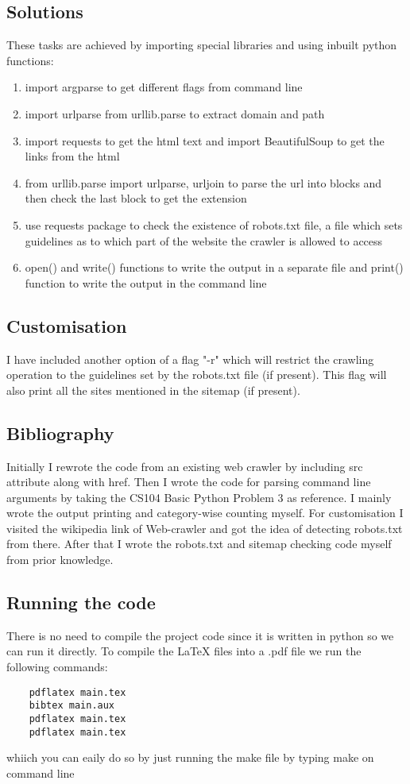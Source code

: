 \documentclass{article}
\begin{document}
\subsection{Solutions}

These tasks are achieved by importing special libraries and using inbuilt python functions:
\begin{enumerate}
    \item import argparse to get different flags from command line
    \item import urlparse from urllib.parse to extract domain and path
    \item import requests to get the html text and import BeautifulSoup to get the links from the html
    \item from urllib.parse import urlparse, urljoin to parse the url into blocks and then check the last block to get the extension
    \item use requests package to check the existence of robots.txt file, a file which sets guidelines as to which part of the website the crawler is allowed to access
    \item open() and write() functions to write the output in a separate file and print() function to write the output in the command line
\end{enumerate}

\subsection{Customisation}
    I have included another option of a flag "-r" which will restrict the crawling operation to the guidelines set by the robots.txt file (if present). This flag will also print all the sites mentioned in the sitemap (if present).

\subsection{Bibliography}
    Initially I rewrote the code from an existing web crawler \cite{gfg} by including src attribute along with href. Then I wrote the code for parsing command line arguments by taking the CS104 Basic Python Problem 3 as reference. I mainly wrote the output printing and category-wise counting myself. For customisation I visited the wikipedia link of Web-crawler and got the idea of detecting robots.txt from there. \cite{wkpd} After that I wrote the robots.txt and sitemap checking code myself from prior knowledge.

\subsection{Running the code}
    There is no need to compile the project code since it is written in python so we can run it directly. To compile the LaTeX files into a .pdf file we run the following commands:
    \begin{verbatim}
    pdflatex main.tex
    bibtex main.aux
    pdflatex main.tex
    pdflatex main.tex
    \end{verbatim}
    whiich you can eaily do so by just running the make file by typing make on command line
    
\end{document}

